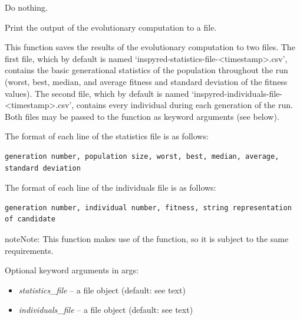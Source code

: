 \documentclass[letterpaper,10pt,english]{sphinxmanual}
\begin{document}

\begin{fulllineitems}
\label{reference:inspyred.ec.observers.default_observer}
Do nothing.

\end{fulllineitems}


\begin{fulllineitems}
\label{reference:inspyred.ec.observers.file_observer}
Print the output of the evolutionary computation to a file.

This function saves the results of the evolutionary computation
to two files. The first file, which by default is named 
`inspyred-statistics-file-\textless{}timestamp\textgreater{}.csv', contains the basic
generational statistics of the population throughout the run
(worst, best, median, and average fitness and standard deviation
of the fitness values). The second file, which by default is named
`inspyred-individuals-file-\textless{}timestamp\textgreater{}.csv', contains every individual
during each generation of the run. Both files may be passed to the
function as keyword arguments (see below).

The format of each line of the statistics file is as follows:

\begin{Verbatim}[commandchars=\\\{\}]
generation number, population size, worst, best, median, average, standard deviation
\end{Verbatim}

The format of each line of the individuals file is as follows:

\begin{Verbatim}[commandchars=\\\{\}]
generation number, individual number, fitness, string representation of candidate
\end{Verbatim}

\begin{notice}{note}{Note:}
This function makes use of the  
function, so it is subject to the same requirements.
\end{notice}

Optional keyword arguments in args:
\begin{itemize}
\item {} 
\emph{statistics\_file} -- a file object (default: see text)

\item {} 
\emph{individuals\_file} -- a file object (default: see text)

\end{itemize}

\end{fulllineitems}
\end{document}

